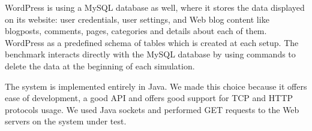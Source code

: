 WordPress is using a MySQL database as well, where it stores the data displayed on its website: user credentials, user settings, and Web blog content like blogposts, comments, pages, categories and details about each of them. WordPress as a predefined schema of tables which is created at each setup. The benchmark interacts directly with the MySQL database by using commands to delete the data at the beginning of each simulation.

The system is implemented entirely in Java. We made this choice because it offers ease of development, a good API and offers good support for TCP and HTTP protocols usage. We used Java sockets and performed GET requests to the Web servers on the system under test.
